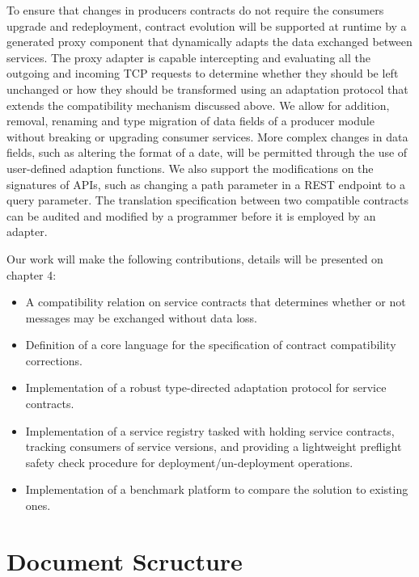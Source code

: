 To ensure that changes in producers contracts do not require the consumers upgrade and redeployment, contract evolution
will be supported at runtime by a generated proxy component that dynamically adapts the data exchanged between services.
The proxy adapter is capable intercepting and evaluating all the outgoing and incoming TCP requests to determine whether
they should be left unchanged or how they should be transformed using an adaptation protocol that extends the compatibility mechanism discussed above.
We allow for addition, removal, renaming and type migration of data fields of a producer module without breaking or upgrading consumer services.
More complex changes in data fields, such as altering the format of a date, will be permitted through the use of user-defined adaption functions.
We also support the modifications on the signatures of APIs, such as changing a path parameter in a REST endpoint to a query parameter.
The translation specification between two compatible contracts can be audited and modified by a programmer before it is employed by an adapter.

Our work will make the following contributions, details will be presented on chapter 4:

\begin{itemize}
    \item A compatibility relation on service contracts that determines whether or not messages may be exchanged without data loss.
    \item Definition of a core language for the specification of contract compatibility corrections.
    \item Implementation of a robust type-directed adaptation protocol for service contracts.
    \item Implementation of a service registry tasked with holding service contracts, tracking consumers of service versions,
    and providing a lightweight preflight safety check procedure for deployment/un-deployment operations.
    \item Implementation of a benchmark platform to compare the solution to existing ones.
\end{itemize}

\section{Document Scructure} %
\label{sec:document_structure}